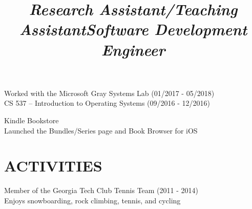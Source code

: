 \documentclass[margin,11pt]{res}
\begin{document}
\begin{resume}
\title{\sl{Research Assistant/Teaching Assistant}}
\begin{position}
    Worked with the Microsoft Gray Systems Lab (01/2017 - 05/2018) \\
    CS 537 – Introduction to Operating Systems (09/2016 - 12/2016)
\end{position}

\title{\sl{Software Development Engineer}}
\begin{position}
Kindle Bookstore\\
Launched the Bundles/Series page and Book Browser for iOS
\end{position}

\section{ACTIVITIES}
Member of the Georgia Tech Club Tennis Team (2011 - 2014)\\
Enjoys snowboarding, rock climbing, tennis, and cycling

\end{resume}
\end{document}
